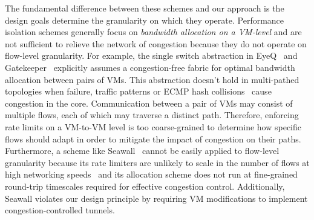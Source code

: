 The fundamental difference between these schemes and our approach is the design
goals determine the granularity on which they operate. 
Performance isolation schemes generally focus on {\em bandwidth allocation on a VM-level} and
are not sufficient to relieve the network of congestion because they do not
operate on flow-level granularity. 
For example, the single switch abstraction
in EyeQ~\cite{jeyakumar2013eyeq} and Gatekeeper~\cite{rodrigues2011gatekeeper} explicitly assumes a congestion-free 
fabric for optimal bandwidth allocation between pairs of VMs. This abstraction doesn't hold in multi-pathed
topologies when failure, traffic patterns or ECMP hash collisions~\cite{al2010hedera} cause congestion in the core.
Communication between a pair of VMs may consist of
multiple flows, each of which may traverse a distinct path. Therefore,
enforcing rate limits on a VM-to-VM level is too coarse-grained to determine how specific flows should adapt in
order to mitigate the impact of congestion on their paths. Furthermore, a scheme like Seawall~\cite{shieh2011sharing}
cannot be easily applied to flow-level granularity because
its rate limiters are unlikely to scale in the number of flows at high networking speeds~\cite{radhakrishnan2014senic}
and its allocation scheme does not run at fine-grained round-trip
timescales required for effective congestion control. Additionally, Seawall violates our design
principle by requiring VM modifications to implement congestion-controlled tunnels.


